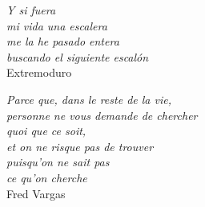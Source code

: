 \thispagestyle{empty}

\vspace*{\fill}
\begin{flushleft}
\textit{Y si fuera \\
mi vida una escalera \\
me la he pasado entera \\
buscando el siguiente escal\'on} \\
\vspace{0.05in}
Extremoduro
\end{flushleft}

\vspace*{\fill}
\begin{flushright}
\textit{Parce que, dans le reste de la vie, \\
personne ne vous demande de chercher \\
quoi que ce soit,\\
et on ne risque pas de trouver\\
puisqu'on ne sait pas \\
ce qu'on cherche} \\
\vspace{0.05in}
Fred Vargas
\end{flushright}
\vspace*{\fill}




